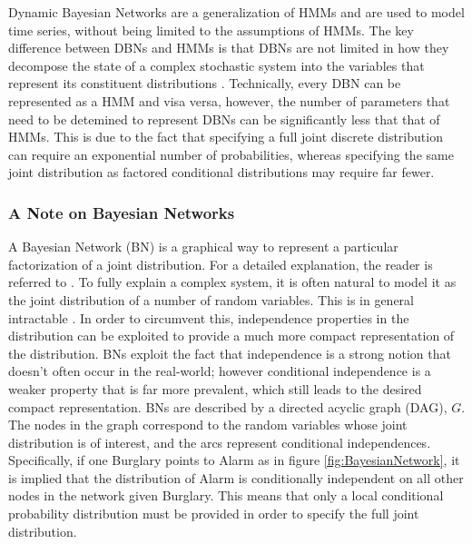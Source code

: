 
Dynamic Bayesian Networks are a generalization of HMMs and are used to model time series, without being limited to the assumptions of HMMs. The key difference between DBNs and HMMs is that DBNs are not limited in how they decompose the state of a complex stochastic system into the variables that represent its constituent distributions \cite{AIAMA}. Technically, every DBN can be represented as a HMM and visa versa, however, the number of parameters that need to be detemined to represent DBNs can be significantly less that that of HMMs. This is due to the fact that specifying a full joint discrete distribution can require an exponential number of probabilities, whereas specifying the same joint distribution as factored conditional distributions may require far fewer.

\subsubsection{A Note on Bayesian Networks}
A Bayesian Network (BN) is a graphical way to represent a particular factorization of a joint distribution. For a detailed explanation, the reader is referred to \cite{KollerPGM}. To fully explain a complex system, it is often natural to model it as the joint distribution of a number of random variables. This is in general intractable \cite{KollerPGM}. In order to circumvent this, independence properties in the distribution can be exploited to provide a much more compact representation of the distribution. BNs exploit the fact that independence is a strong notion that doesn't often occur in the real-world; however conditional independence is a weaker property that is far more prevalent, which still leads to the desired compact representation. BNs are described by a directed acyclic graph (DAG), $G$. The nodes in the graph correspond to the random variables whose joint distribution is of interest, and the arcs represent conditional independences. Specifically, if one Burglary points to Alarm as in figure \ref{fig:BayesianNetwork}, it is implied that the distribution of Alarm is conditionally independent on all other nodes in the network given Burglary. This means that only a local conditional probability distribution must be provided in order to specify the full joint distribution.


